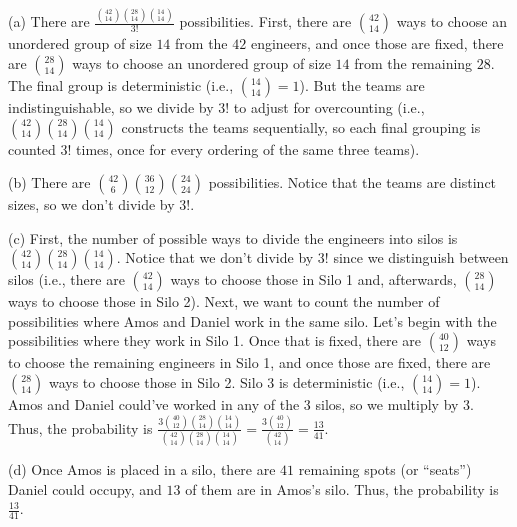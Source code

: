 \documentclass[12pt,oneside]{article}
\theoremstyle{definition}
\theoremstyle{remark}
\begin{document}
\begin{solutionbox}
(a) There are $\frac{\binom{42}{14} \binom{28}{14} \binom{14}{14}}{3!}$ possibilities. First, there are $\binom{42}{14}$ ways to choose an unordered group of size $14$ from the $42$ engineers, and once those are fixed, there are $\binom{28}{14}$ ways to choose an unordered group of size $14$ from the remaining $28$. The final group is deterministic (i.e., $\binom{14}{14} = 1$). But the teams are indistinguishable, so we divide by $3!$ to adjust for overcounting (i.e., $\binom{42}{14} \binom{28}{14} \binom{14}{14}$ constructs the teams sequentially, so each final grouping is counted $3!$ times, once for every ordering of the same three teams).

(b) There are $\binom{42}{6} \binom{36}{12} \binom{24}{24}$ possibilities. Notice that the teams are distinct sizes, so we don't divide by $3!$.

(c) First, the number of possible ways to divide the engineers into silos is $\binom{42}{14} \binom{28}{14} \binom{14}{14}$. Notice that we don't divide by $3!$ since we distinguish between silos (i.e., there are $\binom{42}{14}$ ways to choose those in Silo 1 and, afterwards, $\binom{28}{14}$ ways to choose those in Silo 2). Next, we want to count the number of possibilities where Amos and Daniel work in the same silo. Let's begin with the possibilities where they work in Silo 1. Once that is fixed, there are $\binom{40}{12}$ ways to choose the remaining engineers in Silo 1, and once those are fixed, there are $\binom{28}{14}$ ways to choose those in Silo 2. Silo 3 is deterministic (i.e., $\binom{14}{14} = 1$). Amos and Daniel could've worked in any of the 3 silos, so we multiply by 3. Thus, the probability is $\frac{3 \binom{40}{12} \binom{28}{14} \binom{14}{14}}{\binom{42}{14} \binom{28}{14} \binom{14}{14}} = \frac{3 \binom{40}{12}}{\binom{42}{14}} = \frac{13}{41}$.

(d) Once Amos is placed in a silo, there are $41$ remaining spots (or \enquote{seats}) Daniel could occupy, and $13$ of them are in Amos’s silo. Thus, the probability is $\frac{13}{41}$.
\end{solutionbox}
\end{document}
